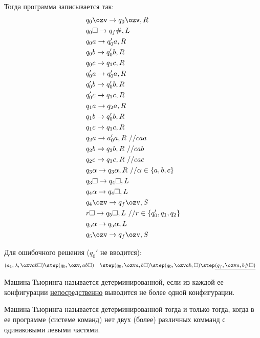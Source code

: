 Тогда программа записывается так:
\begin{align*}
    &q_0\ozv \to q_0\ozv, R\\
    &q_0\square \to q_{f}\#, L \\
    &q_0a \to q_0'a, R \\
    &q_0b \to q_0'b, R \\
    &q_0c \to q_1c, R \\
    &q_0'a \to q_0'a, R\\
    &q_0'b \to q_0'b, R\\
    &q_0'c \to q_1c, R\\
    &q_1a\to q_2a,R\\
    &q_1b \to q_0'b, R\\
    &q_1c\to q_1c,R\\
    &q_2a\to a_0'a, R \text{ //} caa\\
    &q_2b\to q_3b, R \text{ //} cab\\
    &q_2c\to q_1c, R\text{ //} cac\\
    &q_3\alpha \to q_3\alpha, R\text{ //}\alpha \in \{a,b,c\}\\ 
    &q_3\square\to q_4\square,L\\
    &q_4\alpha\to q_4\square,L\\
    &q_4\ozv\to q_{f}\ozv,S \\
    &r\square\to q_5\square, L\text{ //} r \in \{q_0',q_1,q_2\} \\
    &q_5\alpha\to q_5\alpha,L\\
    &q_5\ozv\to q_{f}\ozv, S\\
\end{align*}

Для ошибочного решения ($q_{0}'$ не вводится): \[
\begin{align*}
    &(a_1,\lambda, \ozv ab\square) \step (q_0,\ozv,ab\square)
    &\step (q_0,\ozv a,b\square) \step (q_0,\ozv ab, \square)
    &\step \underline{(q_{f}, \ozv a, b\#\square)}
\end{align*}
\] 

\begin{definition}
Машина Тьюринга называется детерминированной, если из каждой ее конфигурации
\underline{непосредственно} выводится не более одной конфигурации.
\end{definition}

\begin{theorem}
Машина Тьюринга называется детерминированной тогда и только тогда, когда в ее программе
(системе команд) нет двух (более) различных комманд с одинаковыми левыми частями.
\end{theorem}

